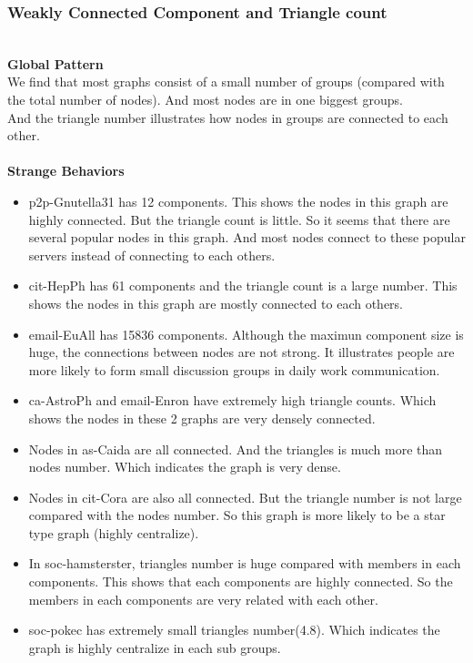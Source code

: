 
\subsubsection{Weakly Connected Component and Triangle count}
\\
\textbf{Global Pattern} \\
We find that most graphs consist of a small number of groups (compared with the total number of nodes). And most nodes are in one biggest groups. \\
And the triangle number illustrates how nodes in groups are connected to each other. \\
\\
\textbf{Strange Behaviors} \\
\begin{itemize} 
\item p2p-Gnutella31 has 12 components. This shows the nodes in this graph are highly connected. But the triangle count is little. So it seems that there are several popular nodes in this graph. And most nodes connect to these popular servers instead of connecting to each others. \\
\item cit-HepPh has 61 components and the triangle count is a large number. This shows the nodes in this graph are mostly connected to each others. \\
\item email-EuAll has 15836 components. Although the maximun component size is huge, the connections between nodes are not strong. It illustrates people are more likely to form small discussion groups in daily work communication.
\item ca-AstroPh and email-Enron have extremely high triangle counts. Which shows the nodes in these 2 graphs are very densely connected.
\item Nodes in as-Caida are all connected. And the triangles is much more than nodes number. Which indicates the graph is very dense.
\item Nodes in cit-Cora are also all connected. But the triangle number is not large compared with the nodes number. So this graph is more likely to be a star type graph (highly centralize).
\item In soc-hamsterster, triangles number is huge compared with members in each components. This shows that each components are highly connected. So the members in each components are very related with each other.
\item soc-pokec has extremely small triangles number(4.8). Which indicates the graph is highly centralize in each sub groups.

\end{itemize}
